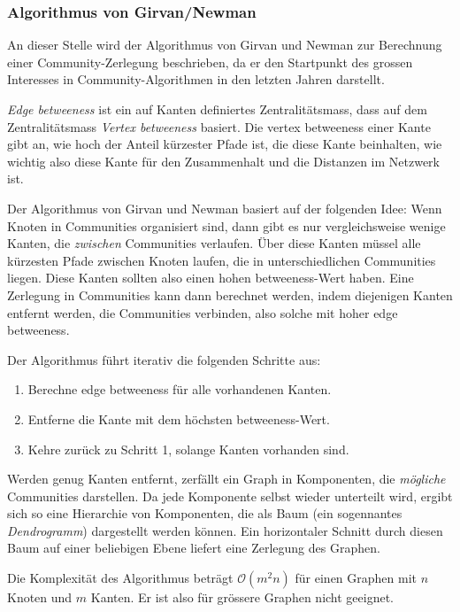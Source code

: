 \subsubsection{Algorithmus von Girvan/Newman}
\label{sec:algor-von-girv-1}

An dieser Stelle wird der Algorithmus von Girvan
und Newman\cite{Newman2004} zur Berechnung einer Community-Zerlegung
beschrieben, da er den Startpunkt des grossen Interesses in
Community-Algorithmen in den letzten Jahren darstellt.

\emph{Edge betweeness} ist ein auf Kanten definiertes
Zentralit\"atsmass, dass auf dem Zentralit\"atsmass \emph{Vertex
  betweeness}\cite{Koschutzki2004a} basiert. Die vertex betweeness
einer Kante gibt an, wie hoch der Anteil k\"urzester Pfade ist, die
diese Kante beinhalten, wie wichtig also diese Kante f\"ur den
Zusammenhalt und die Distanzen im Netzwerk ist.

Der Algorithmus von Girvan und Newman basiert auf der folgenden Idee:
Wenn Knoten in Communities organisiert sind, dann gibt es nur
vergleichsweise wenige Kanten, die \emph{zwischen} Communities
verlaufen. \"Uber diese Kanten m\"ussel alle k\"urzesten Pfade
zwischen Knoten laufen, die in unterschiedlichen Communities
liegen. Diese Kanten sollten also einen hohen betweeness-Wert
haben. Eine Zerlegung in Communities kann dann berechnet werden, indem
diejenigen Kanten entfernt werden, die Communities verbinden, also
solche mit hoher edge betweeness.

Der Algorithmus f\"uhrt iterativ die folgenden Schritte aus:

\begin{enumerate}
\item Berechne edge betweeness f\"ur alle vorhandenen Kanten.
\item Entferne die Kante mit dem h\"ochsten betweeness-Wert.
\item Kehre zur\"uck zu Schritt 1, solange Kanten vorhanden sind.
\end{enumerate}

Werden genug Kanten entfernt, zerf\"allt ein Graph in Komponenten, die
\emph{m\"ogliche} Communities darstellen. Da jede Komponente selbst
wieder unterteilt wird, ergibt sich so eine Hierarchie von
Komponenten, die als Baum (ein sogennantes \emph{Dendrogramm})
dargestellt werden k\"onnen. Ein horizontaler Schnitt durch diesen
Baum auf einer beliebigen Ebene liefert eine Zerlegung des Graphen.

Die Komplexit\"at des Algorithmus betr\"agt $\mathcal{O}(m^2n)$ f\"ur
einen Graphen mit $n$ Knoten und $m$ Kanten. Er ist also f\"ur
gr\"ossere Graphen nicht geeignet.

